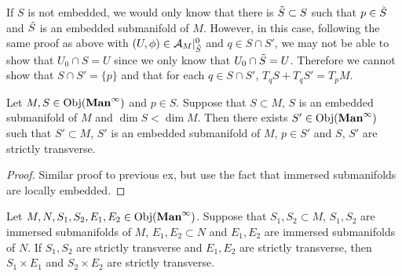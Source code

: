 \documentclass{book}
\begin{document}
	\begin{note}
		If $S$ is not embedded, we would only know that there is $\tilde{S} \subset S$ such that $p \in \tilde{S}$ and $\tilde{S}$ is an embedded submanifold of $M$. However, in this case, following the same proof as above with $(U, \phi) \in \mathcal{A}_M|^0_{\tilde{S}}$ and $q \in S \cap S'$, we may not be able to show that $U_0 \cap S = U$ since we only know that $U_0 \cap \tilde{S} = U$. Therefore we cannot show that $S \cap S' = \{p\}$ and that for each $q \in S \cap S'$, $T_q S + T_q S' = T_p M$. 
	\end{note}
	
	\begin{ex} 
		Let $M, S \in \operatorname{Obj}(\operatorname*{\text{\textbf{Man}}^{\infty}})$ and $p \in S$. Suppose that $S \subset M$, $S$ is an embedded submanifold of $M$ and $\dim S < \dim M$. Then there exists $S' \in \operatorname{Obj}(\operatorname*{\text{\textbf{Man}}^{\infty}})$ such that $S' \subset M$, $S'$ is an embedded submanifold of $M$, $p \in S'$ and $S$, $S'$ are strictly transverse. 
	\end{ex}
	
	\begin{proof}
		Similar proof to previous ex, but use the fact that immersed submanifolds are locally embedded. 
	\end{proof}

	\begin{ex} 
		Let $M, N, S_1, S_2, E_1, E_2 \in \operatorname{Obj}(\operatorname*{\text{\textbf{Man}}^{\infty}})$. Suppose that $S_1, S_2 \subset M$, $S_1, S_2$ are immersed submanifolds of $M$, $E_1, E_2 \subset N$ and $E_1, E_2$ are immersed submanifolds of $N$. If $S_1, S_2$ are strictly transverse and $E_1, E_2$ are strictly transverse, then $S_1 \times E_1$ and $S_2 \times E_2$ are strictly transverse. 
	\end{ex}
\end{document}

